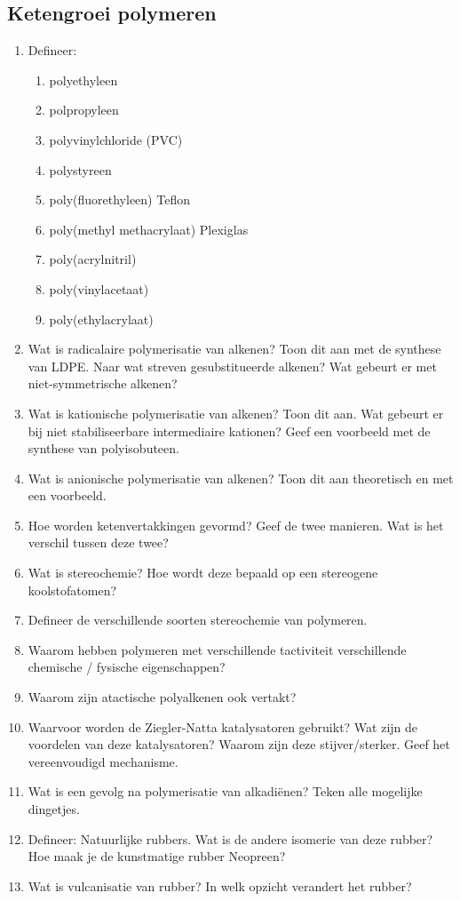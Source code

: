 \documentclass[a4paper,12pt]{article}
\begin{document}
    \subsection*{Ketengroei polymeren}
    \begin{enumerate}
        \item Defineer:
        \begin{enumerate}
            \item polyethyleen
            \item polpropyleen
            \item polyvinylchloride (PVC)
            \item polystyreen
            \item poly(fluorethyleen)     Teflon \textregistered
            \item poly(methyl methacrylaat)    Plexiglas \textregistered
            \item poly(acrylnitril)
            \item poly(vinylacetaat)
            \item poly(ethylacrylaat)
        \end{enumerate}
        \item Wat is radicalaire polymerisatie van alkenen? Toon dit aan met de synthese van LDPE. Naar wat streven gesubstitueerde alkenen? Wat gebeurt er met niet-symmetrische alkenen?
        \item Wat is kationische polymerisatie van alkenen? Toon dit aan. Wat gebeurt er bij niet stabiliseerbare intermediaire kationen? Geef een voorbeeld met de synthese van polyisobuteen.
        \item Wat is anionische polymerisatie van alkenen? Toon dit aan theoretisch en met een voorbeeld.
        \item Hoe worden ketenvertakkingen gevormd? Geef de twee manieren. Wat is het verschil tussen deze twee?
        \item Wat is stereochemie? Hoe wordt deze bepaald op een stereogene koolstofatomen? 
        \item Defineer de verschillende soorten stereochemie van polymeren.
        \item Waarom hebben polymeren met verschillende tactiviteit verschillende chemische / fysische eigenschappen?
        \item Waarom zijn atactische polyalkenen ook vertakt?
        \item Waarvoor worden de Ziegler-Natta katalysatoren gebruikt? Wat zijn de voordelen van deze katalysatoren? Waarom zijn deze stijver/sterker. Geef het vereenvoudigd mechanisme.
        \item Wat is een gevolg na polymerisatie van alkadiënen? Teken alle mogelijke dingetjes.
        \item Defineer: Natuurlijke rubbers. Wat is de andere isomerie van deze rubber? Hoe maak je de kunstmatige rubber Neopreen? 
        \item Wat is vulcanisatie van rubber? In welk opzicht verandert het rubber?
    \end{enumerate}
\end{document}
